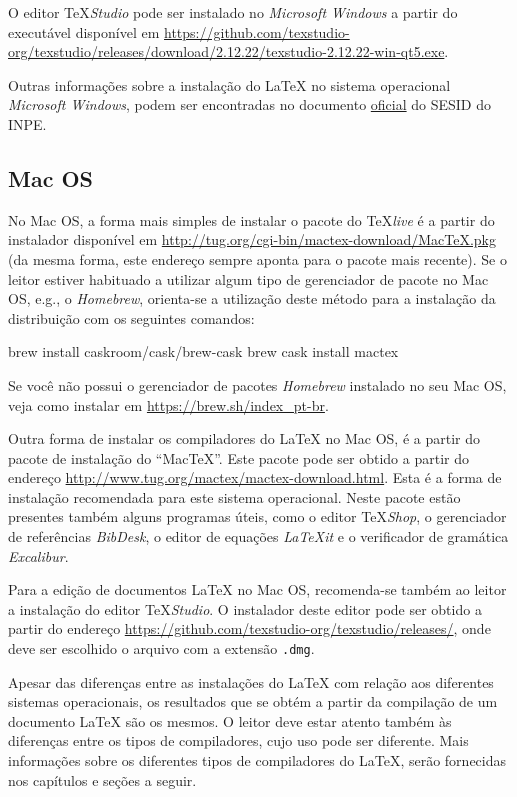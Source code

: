 O editor \TeX \textit{Studio} pode ser instalado no \textit{Microsoft Windows} a partir do executável disponível em \url{https://github.com/texstudio-org/texstudio/releases/download/2.12.22/texstudio-2.12.22-win-qt5.exe}.

Outras informações sobre a instalação do \LaTeX{} no sistema operacional \textit{Microsoft Windows}, podem ser encontradas no documento \href{http://mtc-m16d.sid.inpe.br/col/sid.inpe.br/mtc-m19@80/2010/03.24.15.12/doc/ambiente_latex_no_windows.pdf}{oficial} do SESID do INPE.

\subsection*{Mac OS}
\label{sec:macos}

No Mac OS, a forma mais simples de instalar o pacote do \TeX \textit{live} é a partir do instalador disponível em \url{http://tug.org/cgi-bin/mactex-download/MacTeX.pkg} (da mesma forma, este endereço sempre aponta para o pacote mais recente). Se o leitor estiver habituado a utilizar algum tipo de gerenciador de pacote no Mac OS, e.g., o \textit{Homebrew}, orienta-se a utilização deste método para a instalação da distribuição com os seguintes comandos:

\begin{meucomando}
brew install caskroom/cask/brew-cask
brew cask install mactex
\end{meucomando}

\begin{marker}
Se você não possui o gerenciador de pacotes \textit{Homebrew} instalado no seu Mac OS, veja como instalar em \url{https://brew.sh/index_pt-br}.
\end{marker}

Outra forma de instalar os compiladores do \LaTeX{} no Mac OS, é a partir do pacote de instalação do ``MacTeX''. Este pacote pode ser obtido a partir do endereço \url{http://www.tug.org/mactex/mactex-download.html}. Esta é a forma de instalação recomendada para este sistema operacional. Neste pacote estão presentes também alguns programas úteis, como o editor \TeX \textit{Shop}, o gerenciador de referências \textit{BibDesk}, o editor de equações \textit{LaTeXit} e o verificador de gramática \textit{Excalibur}.

Para a edição de documentos \LaTeX{} no Mac OS, recomenda-se também ao leitor a instalação do editor \TeX \textit{Studio}. O instalador deste editor pode ser obtido a partir do endereço \url{https://github.com/texstudio-org/texstudio/releases/}, onde deve ser escolhido o arquivo com a extensão {\tt .dmg}.

Apesar das diferenças entre as instalações do \LaTeX{} com relação aos diferentes sistemas operacionais, os resultados que se obtém a partir da compilação de um documento \LaTeX{} são os mesmos. O leitor deve estar atento também às diferenças entre os tipos de compiladores, cujo uso pode ser diferente. Mais informações sobre os diferentes tipos de compiladores do \LaTeX{}, serão fornecidas nos capítulos e seções a seguir.
